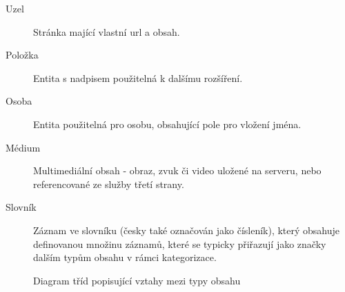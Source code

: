 \begin{description}
  \item[Uzel] Stránka mající vlastní \gls{url} a obsah.
  \item[Položka] Entita s nadpisem použitelná k dalšímu rozšíření.
  \item[Osoba] Entita použitelná pro osobu, obsahující pole pro vložení jména.
  \item[Médium] Multimediální obsah - obraz, zvuk či video uložené na serveru, nebo referencované ze služby třetí strany.
  \item[Slovník] Záznam ve slovníku (česky také označován jako čísleník), který obsahuje definovanou množinu záznamů, které se typicky přiřazují jako značky dalším typům obsahu v rámci kategorizace.
\end{description}

\begin{figure}[htp] 
\caption{Diagram tříd popisující vztahy mezi typy obsahu}
\label{fig:class-diagram}
\end{figure}  

